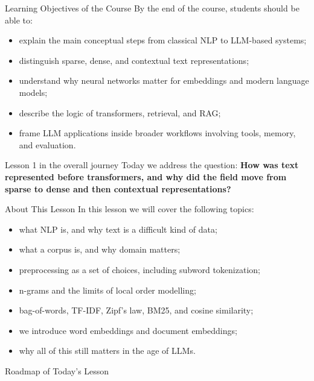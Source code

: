 \documentclass[aspectratio=169]{beamer}
\begin{document}
\begin{frame}{Learning Objectives of the Course}
By the end of the course, students should be able to:
\begin{itemize}
    \item explain the main conceptual steps from classical NLP to LLM-based systems;
    \item distinguish sparse, dense, and contextual text representations;
    \item understand why neural networks matter for embeddings and modern language models;
    \item describe the logic of transformers, retrieval, and RAG;
    \item frame LLM applications inside broader workflows involving tools, memory, and evaluation.
\end{itemize}

\vspace{0.15cm}
\begin{block}{Lesson 1 in the overall journey}
Today we address the question: \textbf{How was text represented before transformers, and why did the field move from sparse to dense and then contextual representations?}
\end{block}
\end{frame}
%
%
\begin{frame}{About This Lesson}
In this lesson we will cover the following topics:
\begin{itemize}
    \item what NLP is, and why text is a difficult kind of data;
    \item what a corpus is, and why domain matters;
    \item preprocessing as a set of choices, including subword tokenization;
    \item n-grams and the limits of local order modelling;
    \item bag-of-words, TF-IDF, Zipf's law, BM25, and cosine similarity;
    \item we introduce word embeddings and document embeddings;
    \item why all of this still matters in the age of LLMs.
\end{itemize}
\end{frame}
%
%
\begin{frame}{Roadmap of Today's Lesson}
\tableofcontents
\end{frame}
%
\end{document}
